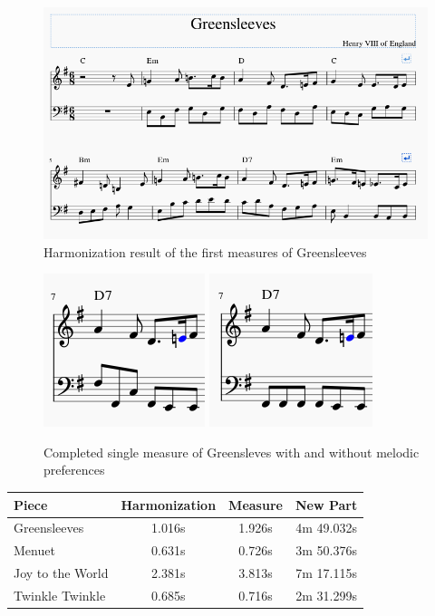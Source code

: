 \begin{figure}
	\centering
	\includegraphics[width=0.8\linewidth]{imagenes/evaluation/greensleeves_harm.png}
	\caption{Harmonization result of the first measures of Greensleeves}
	\label{fig:greensleeves_harm}
\end{figure}

\begin{figure}
   	\centering
   	\includegraphics[width=0.2\linewidth,valign=c]{imagenes/evaluation/greensleeves_measure.png}
   	\includegraphics[width=0.2\linewidth,valign=c]{imagenes/evaluation/greensleeves_measure_melodious.png}
   	\caption{Completed single measure of Greensleves with and without melodic preferences}
   	\label{fig:greensleeves_measure}
\end{figure}

\begin{center}
	\begin{tabular}{ | l | c | c | c | }
		\hline
		Piece 			& Harmonization 	& Measure & New Part \\ \hline \hline
		Greensleeves 	& 1.016s 			& 1.926s	& 4m 49.032s \\ \hline
		Menuet 			& 0.631s 			& 0.726s 	& 3m 50.376s \\ \hline
		Joy to the World& 2.381s 			& 3.813s	& 7m 17.115s \\ \hline
		Twinkle Twinkle & 0.685s 			& 0.716s 	& 2m 31.299s \\ \hline
	\end{tabular}
\end{center}

